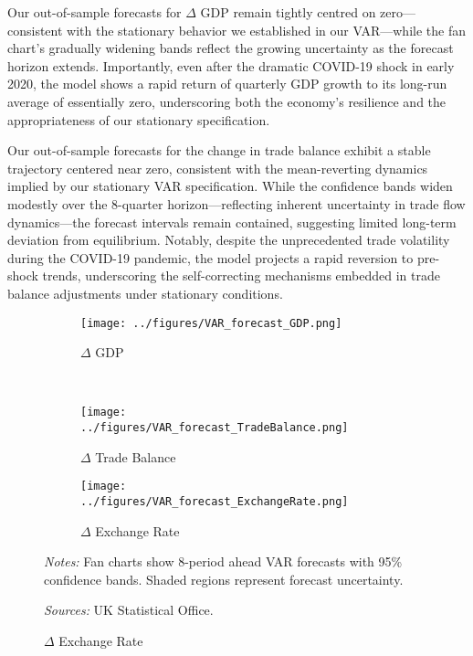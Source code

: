 \documentclass[
]{article}
\begin{document}
	Our out-of-sample forecasts for $\Delta$ GDP remain tightly centred on zero—consistent 
	with the stationary behavior we established in our VAR—while the fan chart’s 
	gradually widening bands reflect the growing uncertainty as the forecast 
	horizon extends. Importantly, even after the dramatic COVID-19 shock in early 
	2020, the model shows a rapid return of quarterly GDP growth to its long-run 
	average of essentially zero, underscoring both the economy’s resilience and 
	the appropriateness of our stationary specification.
	
	Our out-of-sample forecasts for the change in trade balance exhibit a stable trajectory 
	centered near zero, consistent with the mean-reverting dynamics implied by our 
	stationary VAR specification. While the confidence bands widen modestly
	over the 8-quarter horizon—reflecting inherent uncertainty in trade flow
	dynamics—the forecast intervals remain contained, suggesting limited long-term 
	deviation from equilibrium. Notably, despite the unprecedented trade volatility 
	during the COVID-19 pandemic, the model projects a rapid reversion to pre-shock 
	trends, underscoring the self-correcting mechanisms embedded in trade balance 
	adjustments under stationary conditions.
	
	\begin{figure}[!htbp]
		\centering
		\caption{\textsc{VAR Forecasts Performance}}
		\label{fig:var_forecasts}
		
		\begin{subfigure}[b]{0.32\textwidth}
			\centering
			\texttt{[image: ../figures/VAR\_forecast\_GDP.png]}
			\caption{$\Delta$ GDP}
			\label{fig:forecast_gdp}
		\end{subfigure}
		\\
		\begin{subfigure}[b]{0.32\textwidth}
			\centering
			\texttt{[image: ../figures/VAR\_forecast\_TradeBalance.png]}
			\caption{$\Delta$ Trade Balance}
			\label{fig:forecast_tb}
		\end{subfigure}
		\begin{subfigure}[b]{0.32\textwidth}
			\centering
			\texttt{[image: ../figures/VAR\_forecast\_ExchangeRate.png]}
			\caption{$\Delta$ Exchange Rate}
			\label{fig:forecast_fx}
		\end{subfigure}
		
		\begin{minipage}{\textwidth}
			\footnotesize
			\textit{Notes:} Fan charts show 8-period ahead VAR forecasts with 95\% confidence bands. 
			Shaded regions represent forecast uncertainty. 
			
			\textit{Sources:} UK Statistical Office.
		\end{minipage}
	\end{figure}
	
\end{document}
